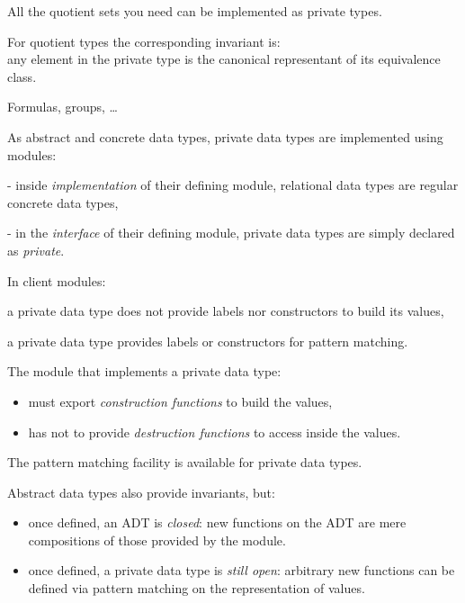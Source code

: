 
All the quotient sets you need can be implemented as private types.

For quotient types the corresponding invariant is:\\
any element in the private type is the canonical representant of its
equivalence class.

Formulas, groups, \ldots


As abstract and concrete data types, private data types are implemented using modules:

- inside {\em implementation} of their defining module, relational data types
are regular concrete data types,

- in the {\em interface} of their defining module, private data types are simply
declared as {\em private}.


In client modules:\\
\begin{citemize}
  \item a private data type does not provide labels nor constructors to build its values,
  \item a private data type provides labels or constructors for pattern matching.
\end{citemize}


The module that implements a private data type:

\begin{itemize}
 \item must export {\em construction functions} to build the values,
 \item has not to provide {\em destruction functions} to access inside
the values.
\end{itemize}

The pattern matching facility is available for private data types.

\vfill


Abstract data types also provide invariants, but:

\begin{itemize}

 \item once defined, an ADT is {\em closed}: new functions on the ADT
are mere compositions of those provided by the module.

 \item once defined, a private data type is {\em still open}: arbitrary new
functions can be defined via pattern matching on the representation of
values.

\end{itemize}

